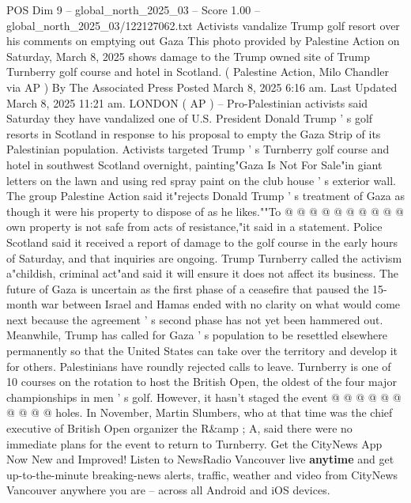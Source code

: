 \begin{textsample}{POS Dim 9 – global\_north\_2025\_03 – Score 1.00 – global\_north\_2025\_03/122127062.txt}  \label{ex:f9_pos_304}
Activists vandalize Trump golf resort over his comments on emptying out Gaza This photo provided by Palestine Action on Saturday, March 8, 2025 shows damage to the Trump owned site of Trump Turnberry golf course and hotel in Scotland. ( Palestine Action, Milo Chandler via AP ) By The Associated Press Posted March 8, 2025 6:16 am.
Last Updated March 8, 2025 11:21 am.
LONDON ( AP ) -- Pro-Palestinian activists said Saturday they have vandalized one of U.S.
President Donald Trump ' s golf resorts in Scotland in response to his proposal to empty the Gaza Strip of its Palestinian population.
Activists targeted Trump ' s Turnberry golf course and hotel in southwest Scotland overnight, painting"Gaza Is Not For Sale"in giant letters on the lawn and using red spray paint on the club house ' s exterior wall.
The group Palestine Action said it"rejects Donald Trump ' s treatment of Gaza as though it were his property to dispose of as he likes.""To @ @ @ @ @ @ @ @ @ @ own property is not safe from acts of resistance,"it said in a statement.
Police Scotland said it received a report of damage to the golf course in the early hours of Saturday, and that inquiries are ongoing.
Trump Turnberry called the activism a"childish, criminal act"and said it will ensure it does not affect its business.
The future of Gaza is uncertain as the first phase of a ceasefire that paused the 15-month war between Israel and Hamas ended with no clarity on what would come next because the agreement ' s second phase has not yet been hammered out.
Meanwhile, Trump has called for Gaza ' s population to be resettled elsewhere permanently so that the United States can take over the territory and develop it for others.
Palestinians have roundly rejected calls to leave.
Turnberry is one of 10 courses on the rotation to host the British Open, the oldest of the four major championships in men ' s golf.
However, it hasn't staged the event @ @ @ @ @ @ @ @ @ @ holes.
In November, Martin Slumbers, who at that time was the chief executive of British Open organizer the R\&amp ; A, said there were no immediate plans for the event to return to Turnberry.
Get the CityNews App Now New and Improved!
Listen to NewsRadio Vancouver live \textbf{anytime} and get up-to-the-minute breaking-news alerts, traffic, weather and video from CityNews Vancouver anywhere you are -- across all Android and iOS devices.

\end{textsample}
